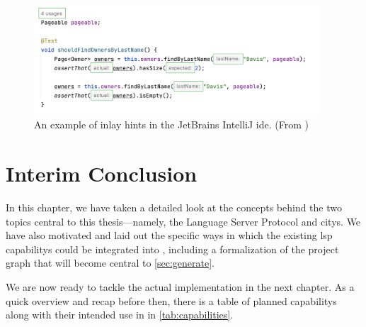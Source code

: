 \documentclass[../thesis]{subfiles}
\begin{document}
\begin{figure}
	\begin{center}
		\includegraphics[width=0.95\textwidth]{figures/inlay_hints_example}
	\end{center}
	\caption{An example of inlay hints in the JetBrains IntelliJ \gls{ide}. (From )}\label{fig:inlay}
\end{figure}


\section{Interim Conclusion}
In this chapter, we have taken a detailed look at the concepts behind the two topics central to this thesis---namely, the {Language Server Protocol} and \glspl{city}.
We have also motivated and laid out the specific ways in which the existing \gls{lsp} \glspl{capability} could be integrated into \SEE{}, including a formalization of the project graph that will become central to \cref{sec:generate}.

We are now ready to tackle the actual implementation in the next chapter.
As a quick overview and recap before then, there is a table of planned \glspl{capability} along with their intended use in \SEE{} in \cref{tab:capabilities}.
\end{document}
